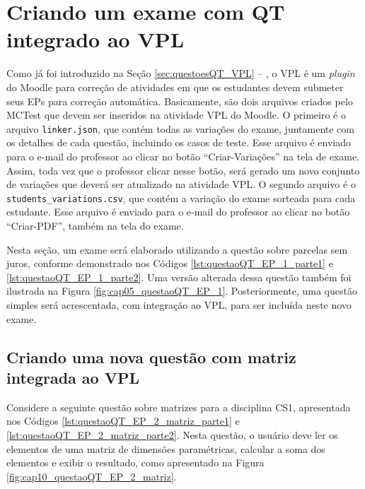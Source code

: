 \section{Criando um exame com QT integrado ao VPL}

Como já foi introduzido na Seção \ref{sec:questoesQT_VPL} -- , o VPL é um \textit{plugin} do Moodle para correção de atividades em que os estudantes devem submeter seus EPs para correção automática. Basicamente, são dois arquivos criados pelo MCTest que devem ser inseridos na atividade VPL do Moodle. O primeiro é o arquivo \verb|linker.json|, que contém todas as variações do exame, juntamente com os detalhes de cada questão, incluindo os casos de teste. Esse arquivo é enviado para o e-mail do professor ao clicar no botão ``Criar-Variações'' na tela de exame. Assim, toda vez que o professor clicar nesse botão, será gerado um novo conjunto de variações que deverá ser atualizado na atividade VPL. O segundo arquivo é o \verb|students_variations.csv|, que contém a variação do exame sorteada para cada estudante. Esse arquivo é enviado para o e-mail do professor ao clicar no botão ``Criar-PDF'', também na tela do exame.

Nesta seção, um exame será elaborado utilizando a questão sobre parcelas sem juros, conforme demonstrado nos Códigos \ref{lst:questaoQT_EP_1_parte1} e \ref{lst:questaoQT_EP_1_parte2}. Uma versão alterada dessa questão também foi ilustrada na Figura \ref{fig:cap05_questaoQT_EP_1}. Posteriormente, uma questão simples será acrescentada, com integração ao VPL, para ser incluída neste novo exame.

\subsection{Criando uma nova questão com matriz integrada ao VPL}

Considere a seguinte questão sobre matrizes para a disciplina CS1, apresentada nos Códigos \ref{lst:questaoQT_EP_2_matriz_parte1} e \ref{lst:questaoQT_EP_2_matriz_parte2}. Nesta questão, o usuário deve ler os elementos de uma matriz de dimensões paramétricas, calcular a soma dos elementos e exibir o resultado, como apresentado na Figura \ref{fig:cap10_questaoQT_EP_2_matriz}.


